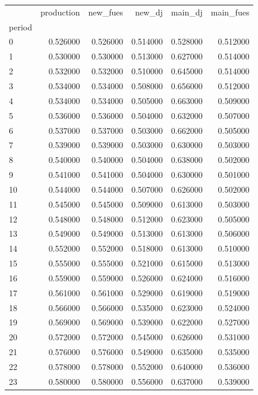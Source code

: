 \begin{tabular}{lrrrrr}
\toprule
 & production & new_fues & new_dj & main_dj & main_fues \\
period &  &  &  &  &  \\
\midrule
0 & 0.526000 & 0.526000 & 0.514000 & 0.528000 & 0.512000 \\
1 & 0.530000 & 0.530000 & 0.513000 & 0.627000 & 0.514000 \\
2 & 0.532000 & 0.532000 & 0.510000 & 0.645000 & 0.514000 \\
3 & 0.534000 & 0.534000 & 0.508000 & 0.656000 & 0.512000 \\
4 & 0.534000 & 0.534000 & 0.505000 & 0.663000 & 0.509000 \\
5 & 0.536000 & 0.536000 & 0.504000 & 0.632000 & 0.507000 \\
6 & 0.537000 & 0.537000 & 0.503000 & 0.662000 & 0.505000 \\
7 & 0.539000 & 0.539000 & 0.503000 & 0.630000 & 0.503000 \\
8 & 0.540000 & 0.540000 & 0.504000 & 0.638000 & 0.502000 \\
9 & 0.541000 & 0.541000 & 0.504000 & 0.630000 & 0.501000 \\
10 & 0.544000 & 0.544000 & 0.507000 & 0.626000 & 0.502000 \\
11 & 0.545000 & 0.545000 & 0.509000 & 0.613000 & 0.503000 \\
12 & 0.548000 & 0.548000 & 0.512000 & 0.623000 & 0.505000 \\
13 & 0.549000 & 0.549000 & 0.513000 & 0.613000 & 0.506000 \\
14 & 0.552000 & 0.552000 & 0.518000 & 0.613000 & 0.510000 \\
15 & 0.555000 & 0.555000 & 0.521000 & 0.615000 & 0.513000 \\
16 & 0.559000 & 0.559000 & 0.526000 & 0.624000 & 0.516000 \\
17 & 0.561000 & 0.561000 & 0.529000 & 0.619000 & 0.519000 \\
18 & 0.566000 & 0.566000 & 0.535000 & 0.623000 & 0.524000 \\
19 & 0.569000 & 0.569000 & 0.539000 & 0.622000 & 0.527000 \\
20 & 0.572000 & 0.572000 & 0.545000 & 0.626000 & 0.531000 \\
21 & 0.576000 & 0.576000 & 0.549000 & 0.635000 & 0.535000 \\
22 & 0.578000 & 0.578000 & 0.552000 & 0.640000 & 0.536000 \\
23 & 0.580000 & 0.580000 & 0.556000 & 0.637000 & 0.539000 \\

\end{tabular}
